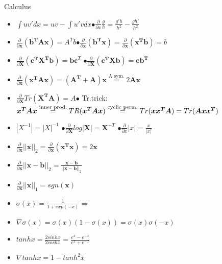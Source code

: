 Calculus
\begin{itemize}
    \item $\int uv'dx = uv - \int u'vdx$\hspace{0.3cm}$ \bullet\frac{\partial}{\partial x}\frac{g}{h} = \frac{g'h}{h^2} - \frac{gh'}{h^2}$
    \item $\frac{\partial}{\partial\boldsymbol{ x}}(\boldsymbol{b^TAx})=A^Tb$\hspace{0.3cm}$\bullet \frac{\partial}{\partial\boldsymbol{ x}}(\boldsymbol{b^Tx}) = \frac{\partial}{\partial\boldsymbol{ x}}(\boldsymbol{x^Tb}) = b$
    \item $\frac{\partial}{\partial\boldsymbol{ X}}(\boldsymbol{c^TX^Tb}) = \boldsymbol{bc}^T$ \hspace{0.3cm} $\bullet\frac{\partial}{\partial\boldsymbol{ X}}(\boldsymbol{c^TXb}) = \boldsymbol{cb^T}$
    \item $\frac{\partial}{\partial\boldsymbol{ x}}(\boldsymbol{x^TAx})=(\boldsymbol{A^T +A})\boldsymbol{x} \overset{\text{A sym.}}{=} 2\boldsymbol{Ax}$
    \item $\frac{\partial}{\partial\boldsymbol{ X}}Tr(\boldsymbol{X^TA}) = A$\hspace{0.3cm}$\bullet$ Tr.trick: $\boldsymbol{x^TAx} \overset{\text{inner prod.}}{=}\\
    TR(\boldsymbol{x^TAx}) \overset{\text{cyclic perm.}}{=} Tr(\boldsymbol{xx^TA}) = Tr(\boldsymbol{Axx^T})$
    \item $|X^{-1}|=|X|^{-1}$ \hspace{0.02cm} $\bullet \frac{\partial}{\partial\boldsymbol{ X}}log|\boldsymbol{X}|=\boldsymbol{X}^{-T}$ \hspace{0.02cm} $\bullet \frac{\partial}{\partial x}|x| = \frac{x}{|x|}$
    \item $\frac{\partial}{\partial\boldsymbol{ x}}||\boldsymbol{x}||_2 = \frac{\partial}{\partial\boldsymbol{ x}}(\boldsymbol{x^Tx}) = 2\boldsymbol{x}$
    \item $\frac{\partial}{\partial\boldsymbol{ x}}||\boldsymbol{x-b}||_2 = \frac{\boldsymbol{x-b}}{||\boldsymbol{x-b}||_2}$
    \vfill\null \columnbreak
    \item $\frac{\partial}{\partial\boldsymbol{ x}} ||\boldsymbol{x}||_1 = sgn(\boldsymbol{x})$
    \item $\sigma(x) = \frac{1}{1 + exp(-x)} \Rightarrow $
    \item $\nabla \sigma(x) = \sigma(x)(1-\sigma(x)) = \sigma(x)\sigma(-x)$
    \item $tanhx = \frac{2sinhx}{2coshx} = \frac{e^x - e^{-x}}{e^x + e^{-x}}$
    \item $\nabla tanhx = 1 - tanh^2x$
\end{itemize}